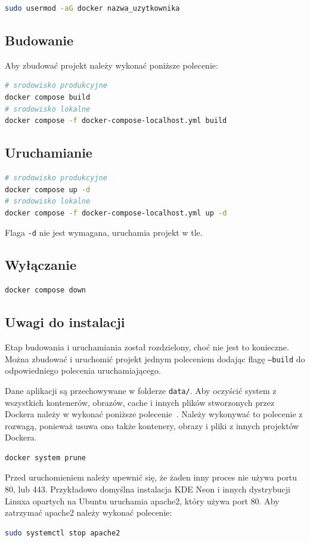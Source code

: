 \documentclass[shortabstract]{iithesis}
\begin{document}
\begin{lstlisting}[language=bash]
sudo usermod -aG docker nazwa_uzytkownika
\end{lstlisting}

\subsection{Budowanie}
\noindent
Aby zbudować projekt należy wykonać poniższe polecenie:

\begin{lstlisting}[language=bash]
# srodowisko produkcyjne
docker compose build
# srodowisko lokalne
docker compose -f docker-compose-localhost.yml build
\end{lstlisting}

\subsection{Uruchamianie}
\begin{lstlisting}[language=bash]
# srodowisko produkcyjne
docker compose up -d
# srodowisko lokalne
docker compose -f docker-compose-localhost.yml up -d
\end{lstlisting}
Flaga \texttt{-d} nie jest wymagana, uruchamia projekt w tle.

\subsection{Wyłączanie}
\begin{lstlisting}[language=bash]
docker compose down
\end{lstlisting}

\subsection{Uwagi do instalacji}
Etap budowania i uruchamiania został rozdzielony, choć nie jest to konieczne.
Można zbudować i uruchomić projekt jednym poleceniem dodając flagę \texttt{--build} do odpowiedniego polecenia uruchamiającego.

Dane aplikacji są przechowywane w folderze \texttt{data/}.
Aby oczyścić system z wszystkich kontenerów, obrazów, cache i innych plików stworzonych przez Dockera należy w wykonać poniższe polecenie~\cite{DockerPrune}.
Należy wykonywać to polecenie z rozwagą, ponieważ usuwa ono także kontenery, obrazy i pliki z innych projektów Dockera.
\begin{lstlisting}[language=bash]
docker system prune
\end{lstlisting}
Przed uruchomieniem należy upewnić się, że żaden inny proces nie używa portu 80, lub 443.
Przykładowo domyślna instalacja KDE Neon i innych dystrybucji Linuxa opartych na Ubuntu uruchamia apache2, który używa port 80.
Aby zatrzymać apache2 należy wykonać polecenie:
\begin{lstlisting}[language=bash]
sudo systemctl stop apache2
\end{lstlisting}
\end{document}
